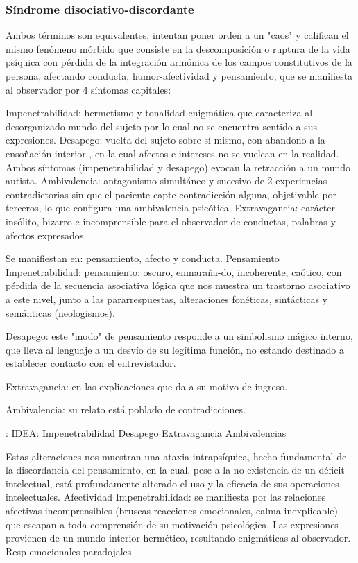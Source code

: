\documentclass{scrbook}
\begin{document}
\subsubsection*{Síndrome disociativo-discordante}
Ambos términos son equivalentes, intentan poner orden a un "caos" y califican el mismo fenómeno mórbido que consiste en la descomposición o ruptura de la vida psíquica con pérdida de la integración armónica de los campos constitutivos de la persona, afectando conducta, humor-afectividad y pensamiento, que se manifiesta al observador por 4 síntomas capitales:

Impenetrabilidad: hermetismo y tonalidad enigmática que caracteriza al desorganizado mundo del sujeto por lo cual no se encuentra sentido a sus expresiones. Desapego: vuelta del sujeto sobre sí mismo, con abandono a la ensoñación interior , en la cual afectos e intereses no se vuelcan en la realidad. Ambos síntomas (impenetrabilidad y desapego) evocan la retracción a un mundo autista. Ambivalencia: antagonismo simultáneo y sucesivo de 2 experiencias contradictorias sin que el paciente capte contradicción alguna, objetivable por terceros, lo que configura una ambivalencia psicótica. Extravagancia: carácter insólito, bizarro e incomprensible para el observador de conductas, palabras y afectos expresados.

Se manifiestan en: pensamiento, afecto y conducta. Pensamiento Impenetrabilidad: pensamiento: oscuro, enmaraña-do, incoherente, caótico, con pérdida de la secuencia asociativa lógica que nos muestra un trastorno asociativo a este nivel, junto a las pararrespuestas, alteraciones fonéticas, sintácticas y semánticas (neologismos).

Desapego: este "modo" de pensamiento responde a un simbolismo mágico interno, que lleva al lenguaje a un desvío de su legítima función, no estando destinado a establecer contacto con el entrevistador.

Extravagancia: en las explicaciones que da a su motivo de ingreso.

Ambivalencia: su relato está poblado de contradicciones.

\faLightbulb: IDEA: Impenetrabilidad Desapego Extravagancia Ambivalencias

Estas alteraciones nos muestran una ataxia intrapsíquica, hecho fundamental de la discordancia del pensamiento, en la cual, pese a la no existencia de un déficit intelectual, está profundamente alterado el uso y la eficacia de sus operaciones intelectuales. Afectividad Impenetrabilidad: se manifiesta por las relaciones afectivas incomprensibles (bruscas reacciones emocionales, calma inexplicable) que escapan a toda comprensión de su motivación psicológica. Las expresiones provienen de un mundo interior hermético, resultando enigmáticas al observador. Resp emocionales paradojales
\end{document}
